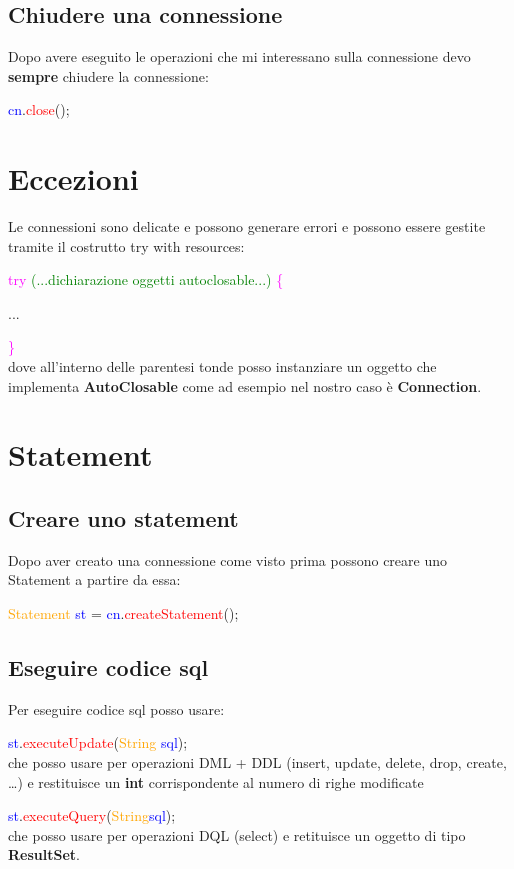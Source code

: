 \documentclass[11pt, letterpaper, titlepage]{article}
\begin{document}
\subsection{Chiudere una connessione}
Dopo avere eseguito le operazioni che mi interessano sulla connessione devo \textbf{sempre} chiudere la connessione:\par
\textcolor{blue}{cn}.\textcolor{red}{close}();

\section{Eccezioni}
Le connessioni sono delicate e possono generare errori e possono essere gestite tramite il costrutto try with resources:\par
\textcolor{magenta}{try} \textcolor{green}{(...dichiarazione oggetti autoclosable...)} \textcolor{magenta}{\{}\par
...\par
\textcolor{magenta}{\}}\\
dove all'interno delle parentesi tonde posso instanziare un oggetto che implementa \textbf{AutoClosable}
come ad esempio nel nostro caso è \textbf{Connection}.

\section{Statement}
\subsection{Creare uno statement}
Dopo aver creato una connessione come visto prima possono creare uno Statement a partire da essa:\par
\textcolor{orange}{Statement} \textcolor{blue}{st} = \textcolor{blue}{cn}.\textcolor{red}{createStatement}();

\subsection{Eseguire codice sql}
Per eseguire codice sql posso usare:\par
\textcolor{blue}{st}.\textcolor{red}{executeUpdate}(\textcolor{orange}{String} \textcolor{blue}{sql});\\
che posso usare per operazioni DML + DDL (insert, update, delete, drop, create, …)
e restituisce un \textbf{int} corrispondente al numero di righe modificate\par
\textcolor{blue}{st}.\textcolor{red}{executeQuery}(\textcolor{orange}{String}\textcolor{blue}{sql});\\
che posso usare per operazioni DQL (select) e retituisce un oggetto di tipo \textbf{ResultSet}.
\end{document}
